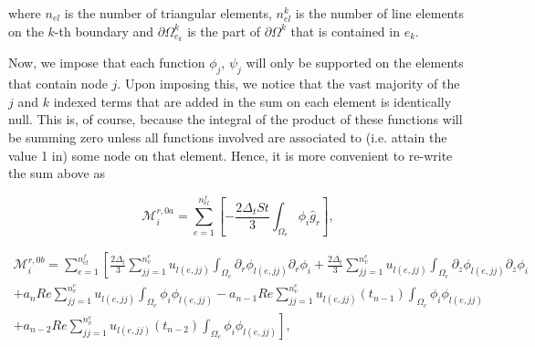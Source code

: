 \documentclass{article}
\begin{document}
where \(n_{el}\) is the number of triangular elements, \(n_{el}^k\) is the number of line elements on the \(k\)-th boundary and \(\partial \Omega_{e_k}^k\) is the part of \(\partial \Omega^k\) that is contained in \(e_k\).

Now, we impose that each function \(\phi_j\), \(\psi_j\) will only be supported on the elements that contain node \(j\). Upon imposing this, we notice that the vast majority of the \(j\) and \(k\) indexed terms that are added in the sum on each element is identically null. This is, of course, because the integral of the product of these functions will be summing zero unless all functions involved are associated to (i.e. attain the value 1 in) some node on that element. Hence, it is more convenient to re-write the sum above as

\begin{equation}
\mathcal{M}_i^{r,0a} = \sum_{e=1}^{n_{el}^f} \left[ -\frac{2\Delta_t St}{3} \int_{\Omega_e} \phi_i \hat{g}_r \right], \tag{4.106}
\end{equation}

\begin{equation}
\begin{array}{l} \mathcal{M}_i^{r,0b} = \sum_{e=1}^{n_{el}^f} \left[ \frac{2\Delta_t}{3} \sum_{jj=1}^{n_v^e} u_{l(e,jj)} \int_{\Omega_e} \partial_r \phi_{l(e,jj)} \partial_r \phi_i + \frac{2\Delta_t}{3} \sum_{jj=1}^{n_v^e} u_{l(e,jj)} \int_{\Omega_e} \partial_z \phi_{l(e,jj)} \partial_z \phi_i \right. \\ + a_n Re \sum_{jj=1}^{n_v^e} u_{l(e,jj)} \int_{\Omega_e} \phi_i \phi_{l(e,jj)} - a_{n-1} Re \sum_{jj=1}^{n_v^e} u_{l(e,jj)}(t_{n-1}) \int_{\Omega_e} \phi_i \phi_{l(e,jj)} \\ \left. + a_{n-2} Re \sum_{jj=1}^{n_v^e} u_{l(e,jj)}(t_{n-2}) \int_{\Omega_e} \phi_i \phi_{l(e,jj)} \right], \end{array} \tag{4.107}
\end{equation}
\end{document}
